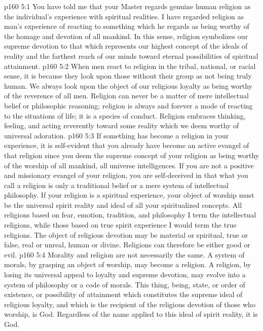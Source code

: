 \vs p160 5:1 You have told me that your Master regards genuine human religion as the individual’s experience with spiritual realities. I have regarded religion as man’s experience of reacting to something which he regards as being worthy of the homage and devotion of all mankind. In this sense, religion symbolizes our supreme devotion to that which represents our highest concept of the ideals of reality and the farthest reach of our minds toward eternal possibilities of spiritual attainment.
\vs p160 5:2 When men react to religion in the tribal, national, or racial sense, it is because they look upon those without their group as not being truly human. We always look upon the object of our religious loyalty as being worthy of the reverence of all men. Religion can never be a matter of mere intellectual belief or philosophic reasoning; religion is always and forever a mode of reacting to the situations of life; it is a species of conduct. Religion embraces thinking, feeling, and acting reverently toward some reality which we deem worthy of universal adoration.
\vs p160 5:3 If something has become a religion in your experience, it is self\hyp{}evident that you already have become an active evangel of that religion since you deem the supreme concept of your religion as being worthy of the worship of all mankind, all universe intelligences. If you are not a positive and missionary evangel of your religion, you are self\hyp{}deceived in that what you call a religion is only a traditional belief or a mere system of intellectual philosophy. If your religion is a spiritual experience, your object of worship must be the universal spirit reality and ideal of all your spiritualized concepts. All religions based on fear, emotion, tradition, and philosophy I term the intellectual religions, while those based on true spirit experience I would term the true religions. The object of religious devotion may be material or spiritual, true or false, real or unreal, human or divine. Religions can therefore be either good or evil.
\vs p160 5:4 Morality and religion are not necessarily the same. A system of morals, by grasping an object of worship, may become a religion. A religion, by losing its universal appeal to loyalty and supreme devotion, may evolve into a system of philosophy or a code of morals. This thing, being, state, or order of existence, or possibility of attainment which constitutes the supreme ideal of religious loyalty, and which is the recipient of the religious devotion of those who worship, is God. Regardless of the name applied to this ideal of spirit reality, it is God.
